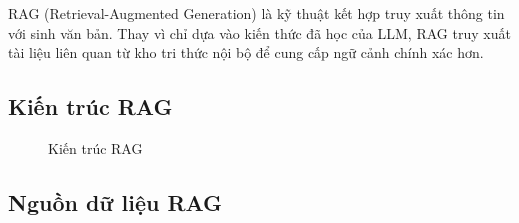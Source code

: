 \documentclass[12pt,a4paper]{report}
\begin{document}
RAG (Retrieval-Augmented Generation) là kỹ thuật kết hợp truy xuất thông tin với sinh văn bản. Thay vì chỉ dựa vào kiến thức đã học của LLM, RAG truy xuất tài liệu liên quan từ kho tri thức nội bộ để cung cấp ngữ cảnh chính xác hơn.

\subsection{Kiến trúc RAG}

\begin{figure}[H]
\centering
{}
\caption{Kiến trúc RAG}
\label{fig:rag_architecture}
\end{figure}

\subsection{Nguồn dữ liệu RAG}
\end{document}
